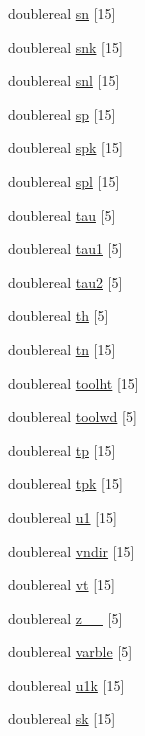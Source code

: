 \begin{DoxyCompactItemize}
\item 
doublereal \hyperlink{structsv__1___a77643210819415e0a221f506fe64bc02}{sn} \mbox{[}15\mbox{]}
\item 
doublereal \hyperlink{structsv__1___ae2a293a126a238a26e63782f519f5fc5}{snk} \mbox{[}15\mbox{]}
\item 
doublereal \hyperlink{structsv__1___afceeb8cdf2635d59e3ef0be5a8788888}{snl} \mbox{[}15\mbox{]}
\item 
doublereal \hyperlink{structsv__1___a9b19f20fe16e6deabbc25a2e1271d01d}{sp} \mbox{[}15\mbox{]}
\item 
doublereal \hyperlink{structsv__1___ab3ee5193bcda7da16cfdd8b14b777181}{spk} \mbox{[}15\mbox{]}
\item 
doublereal \hyperlink{structsv__1___a9d2548d7e4f5b5915224f24e04dedb2f}{spl} \mbox{[}15\mbox{]}
\item 
doublereal \hyperlink{structsv__1___aef2306c3ea79924479cf1686c10bf058}{tau} \mbox{[}5\mbox{]}
\item 
doublereal \hyperlink{structsv__1___ad764beeb9e277771d8dd421d0c806709}{tau1} \mbox{[}5\mbox{]}
\item 
doublereal \hyperlink{structsv__1___a8332ce70772904a47906d115936c980e}{tau2} \mbox{[}5\mbox{]}
\item 
doublereal \hyperlink{structsv__1___aee84f3abb971d1e88a530581da9101cc}{th} \mbox{[}5\mbox{]}
\item 
doublereal \hyperlink{structsv__1___a5ea6302a312b311982a94b05ab3b6182}{tn} \mbox{[}15\mbox{]}
\item 
doublereal \hyperlink{structsv__1___ae00b822916cd43183c17a6bffa1c9fba}{toolht} \mbox{[}15\mbox{]}
\item 
doublereal \hyperlink{structsv__1___a024ddffabd17331e827fd6e8bec9e363}{toolwd} \mbox{[}5\mbox{]}
\item 
doublereal \hyperlink{structsv__1___a0b5b1d84abcccb025565a0615b2a5cbd}{tp} \mbox{[}15\mbox{]}
\item 
doublereal \hyperlink{structsv__1___a8ce4f83fb875b705aae48b761b9e5b29}{tpk} \mbox{[}15\mbox{]}
\item 
doublereal \hyperlink{structsv__1___a96ce900575fd0228b229e8955c1e3525}{u1} \mbox{[}15\mbox{]}
\item 
doublereal \hyperlink{structsv__1___acfac97c5dde7f22731b288c723ee4d67}{vndir} \mbox{[}15\mbox{]}
\item 
doublereal \hyperlink{structsv__1___ad053fbdb83a5306e7cc9e45a5a41ba3c}{vt} \mbox{[}15\mbox{]}
\item 
doublereal \hyperlink{structsv__1___ab48c7bd13e710f0b691eb13e366d9100}{z\+\_\+\+\_\+} \mbox{[}5\mbox{]}
\item 
doublereal \hyperlink{structsv__1___a0e27ecc4a7188a85bd88a9167ae356b9}{varble} \mbox{[}5\mbox{]}
\item 
doublereal \hyperlink{structsv__1___a57e30544c223d12e24e659e3e8078068}{u1k} \mbox{[}15\mbox{]}
\item 
doublereal \hyperlink{structsv__1___ac29dbbdc6cf661f702ef05c8bb062eaf}{sk} \mbox{[}15\mbox{]}
\end{DoxyCompactItemize}


